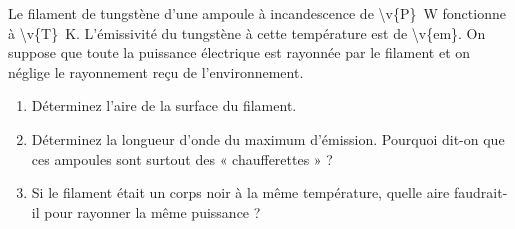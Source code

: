 Le filament de tungstène d'une ampoule à incandescence de \qty{\v{P}}{W} fonctionne à \qty{\v{T}}{K}. L'émissivité du tungstène à cette température est de \num{\v{em}}. On suppose que toute la puissance électrique est rayonnée par le filament et on néglige le rayonnement reçu de l'environnement.

\begin{enumerate}[label=\alph*)]
    \item Déterminez l'aire de la surface du filament.
    \item Déterminez la longueur d'onde du maximum d'émission. Pourquoi dit-on que ces ampoules sont surtout des « chaufferettes » ?
    \item Si le filament était un corps noir à la même température, quelle aire faudrait-il pour rayonner la même puissance ?
\end{enumerate}
